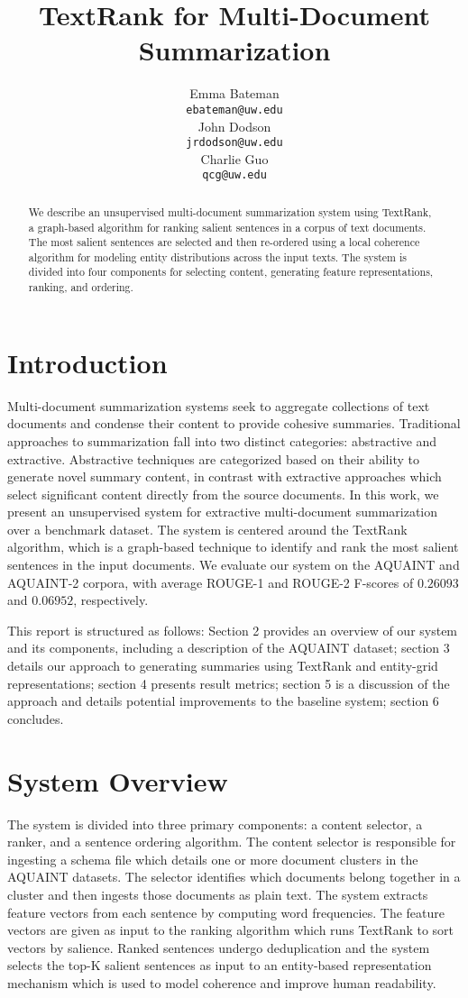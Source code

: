 \documentclass[11pt]{article}
\title{TextRank for Multi-Document Summarization}
\author{Emma Bateman \\
	{\tt ebateman@uw.edu} \\\And
	John Dodson \\
	{\tt jrdodson@uw.edu} \\\And
	Charlie Guo \\
	{\tt qcg@uw.edu}
}
\date{}
\begin{document}
	\maketitle
	\begin{abstract}
		We describe an unsupervised multi-document summarization system using TextRank, a graph-based algorithm for ranking salient sentences in a corpus of text documents. The most salient sentences are selected and then re-ordered using a local coherence algorithm for modeling entity distributions across the input texts. The system is divided into four components for selecting content, generating feature representations, ranking, and ordering.
	\end{abstract}
	
	\section{Introduction}
	
	Multi-document summarization systems seek to aggregate collections of text documents and condense their content to provide cohesive summaries. Traditional approaches to summarization fall into two distinct categories: abstractive and extractive. Abstractive techniques are categorized based on their ability to generate novel summary content, in contrast with extractive approaches which select significant content directly from the source documents. In this work, we present an unsupervised system for extractive multi-document summarization over a benchmark dataset. The system is centered around the TextRank algorithm, which is a graph-based technique to identify and rank the most salient sentences in the input documents. We evaluate our system on the AQUAINT and AQUAINT-2 corpora, with average ROUGE-1 and ROUGE-2 F-scores of $0.26093$ and $0.06952$, respectively. 
	
	This report is structured as follows: Section 2 provides an overview of our system and its components, including a description of the AQUAINT dataset; section 3 details our approach to generating summaries using TextRank and entity-grid representations; section 4 presents result metrics; section 5 is a discussion of the approach and details potential improvements to the baseline system; section 6 concludes.
	
	\section{System Overview}
	The system is divided into three primary components: a content selector, a ranker, and a sentence ordering algorithm. The content selector is responsible for ingesting a schema file which details one or more document clusters in the AQUAINT datasets. The selector identifies which documents belong together in a cluster and then ingests those documents as plain text. The system extracts feature vectors from each sentence by computing word frequencies. The feature vectors are given as input to the ranking algorithm which runs TextRank to sort vectors by salience. Ranked sentences undergo deduplication and the system selects the top-K salient sentences as input to an entity-based representation mechanism which is used to model coherence and improve human readability.
	
\end{document}
